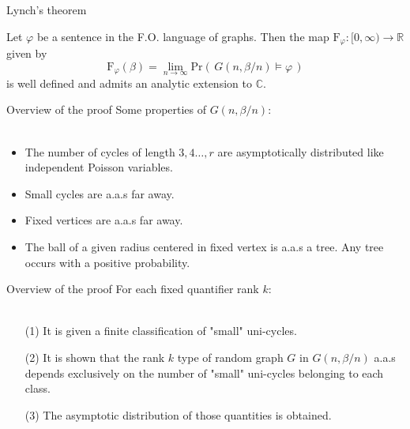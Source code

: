 \documentclass[11pt]{beamer}
\newcommand{\CC}{\mathbb{C}}
\newcommand{\R}{\mathbb{R}}
\newcommand{\Ln}{\lim\limits_{n\to \infty}}
\begin{document}
	\begin{frame}{Lynch's theorem}
	\begin{theorem}[Lynch, 1992]
		Let $\varphi$ be a sentence in the F.O. language of graphs. 
		Then the map $\mathrm{F}_\varphi: [0,\infty) \rightarrow \R$ given by 
		\[\mathrm{F}_\varphi(\beta)=\Ln \mathrm{Pr}(\, G(n,\beta/n)\models \varphi \,) \]
		is well defined and admits an analytic extension to $\CC$.
	\end{theorem}
	\end{frame}
	
	\begin{frame}{Overview of the proof}
	Some properties of $G(n,\beta/n)$:
	\\~\\
	\begin{itemize}
		\item The number of cycles of 
		length $3,4\dots, r$
		are asymptotically distributed like independent Poisson 
		variables.
		\item Small cycles are a.a.s far away.
		\item Fixed vertices are a.a.s far away.
		\item The ball of a given radius centered in fixed
		vertex is a.a.s a tree. Any tree occurs with a positive 
		probability.
	\end{itemize}
	
	\end{frame}

	\begin{frame}{Overview of the proof}
	For each fixed quantifier rank $k$:
	\\~\\
		\begin{itemize}
			\item[(1)]	It is given a finite classification of "small" uni-cycles.
			\item[(2)]  It is shown that the rank $k$ type of random graph $G$
			 in $G(n,\beta/n)$ a.a.s depends exclusively on the number of "small" uni-cycles
			 belonging to each class. 
			\item[(3)] The asymptotic distribution of those quantities is obtained. 
		\end{itemize}
		
	\end{frame}
\end{document}
